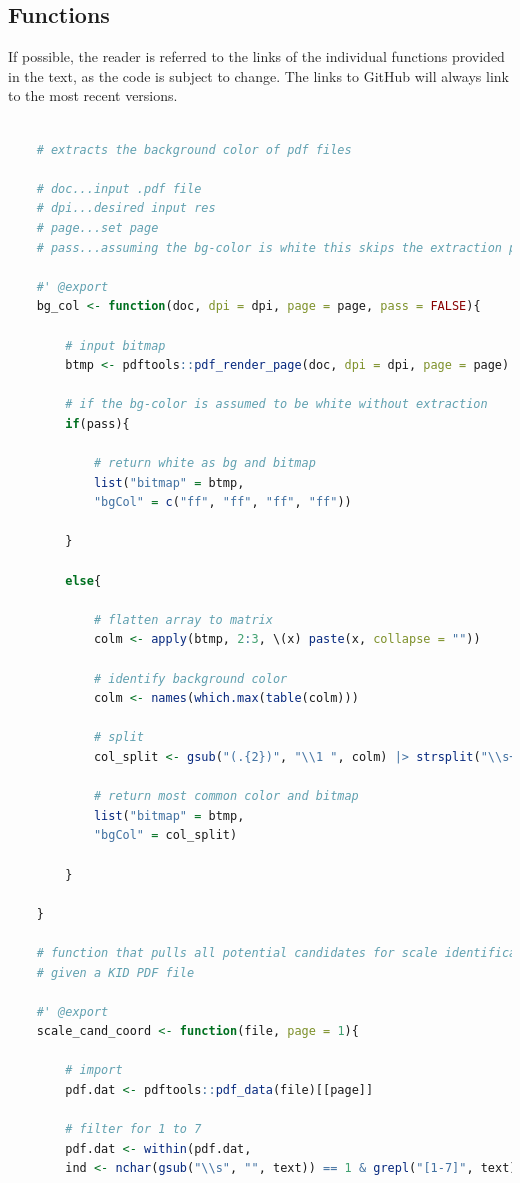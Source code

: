 \documentclass[aodsor,preprint]{imsart}
\numberwithin{equation}{section}
\theoremstyle{plain}
\begin{document}

\subsection{Functions}
If possible, the reader is referred to the links of the individual functions provided in the text, as the code is subject to change. The links to GitHub will always link to the most recent versions.

\begin{lstlisting}[language = R, basicstyle = \tiny]
	
	# extracts the background color of pdf files
	
	# doc...input .pdf file
	# dpi...desired input res
	# page...set page
	# pass...assuming the bg-color is white this skips the extraction process
	
	#' @export
	bg_col <- function(doc, dpi = dpi, page = page, pass = FALSE){
		
		# input bitmap
		btmp <- pdftools::pdf_render_page(doc, dpi = dpi, page = page)
		
		# if the bg-color is assumed to be white without extraction
		if(pass){
			
			# return white as bg and bitmap
			list("bitmap" = btmp,
			"bgCol" = c("ff", "ff", "ff", "ff"))
			
		}
		
		else{
			
			# flatten array to matrix
			colm <- apply(btmp, 2:3, \(x) paste(x, collapse = ""))
			
			# identify background color
			colm <- names(which.max(table(colm)))
			
			# split
			col_split <- gsub("(.{2})", "\\1 ", colm) |> strsplit("\\s+") |> unlist()
			
			# return most common color and bitmap
			list("bitmap" = btmp,
			"bgCol" = col_split)
			
		}
		
	}

	# function that pulls all potential candidates for scale identification of SRRI
	# given a KID PDF file
	
	#' @export
	scale_cand_coord <- function(file, page = 1){
		
		# import
		pdf.dat <- pdftools::pdf_data(file)[[page]]
		
		# filter for 1 to 7 
		pdf.dat <- within(pdf.dat, 
		ind <- nchar(gsub("\\s", "", text)) == 1 & grepl("[1-7]", text))
		

\end{lstlisting}
\end{document}
